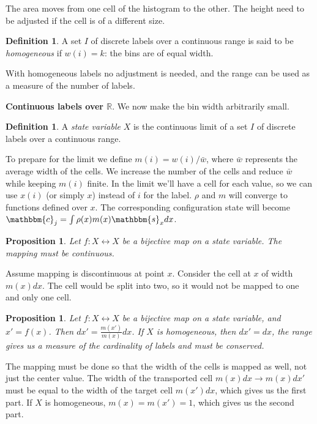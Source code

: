 \documentclass[twocolumn,floatfix,nofootinbib]{revtex4}   %
\theoremstyle{theorem}
\newtheorem{prop}[thm]{Proposition}
\theoremstyle{definition}
\newtheorem{defn}[thm]{Definition}
\begin{document}
The area moves from one cell of the histogram to the other. The height need to be adjusted if the cell is of a different size.

\begin{defn}\label{discreteHomogeneous}
A set $I$ of discrete labels over a continuous range is said to be \emph{homogeneous} if $w(i)=k$: the bins are of equal width.
\end{defn}

With homogeneous labels no adjustment is needed, and the range can be used as a measure of the number of labels.

\textbf{Continuous labels over $\mathbb{R}$}. We now make the bin width arbitrarily small.

\begin{defn}\label{continuousLabels}
A \emph{state variable} $X$ is the continuous limit of a set $I$ of discrete labels over a continuous range.
\end{defn}

To prepare for the limit we define $m(i)=w(i)/\bar{w}$, where $\bar{w}$ represents the average width of the cells. We increase the number of the cells and reduce $\bar{w}$ while keeping $m(i)$ finite. In the limit we'll have a cell for each value, so we can use $x(i)$ (or simply $x$) instead of $i$ for the label. $\rho$ and $m$ will converge to functions defined over $x$. The corresponding configuration state will become $\mathbbm{c}_j=\int \rho(x) m(x) \mathbbm{s}_x dx$.

\begin{prop}\label{continuousMapping}
Let $f: X \leftrightarrow X$ be a bijective map on a state variable. The mapping must be continuous.
\end{prop}
Assume mapping is discontinuous at point $x$. Consider the cell at $x$ of width $m(x)dx$. The cell would be split into two, so it would not be mapped to one and only one cell.

\begin{prop}\label{widthMapping}
Let $f: X \leftrightarrow X$ be a bijective map on a state variable, and $x'=f(x)$. Then $dx' = \frac{m(x')}{m(x)} dx$. If $X$ is homogeneous, then $dx' = dx$, the range gives us a measure of the cardinality of labels and must be conserved.
\end{prop}
The mapping must be done so that the width of the cells is mapped as well, not just the center value. The width of the transported cell $m(x)dx \rightarrow m(x) dx'$ must be equal to the width of the target cell $m(x')dx$, which gives us the first part. If $X$ is homogeneous, $m(x)=m(x')=1$, which gives us the second part.
\end{document}
